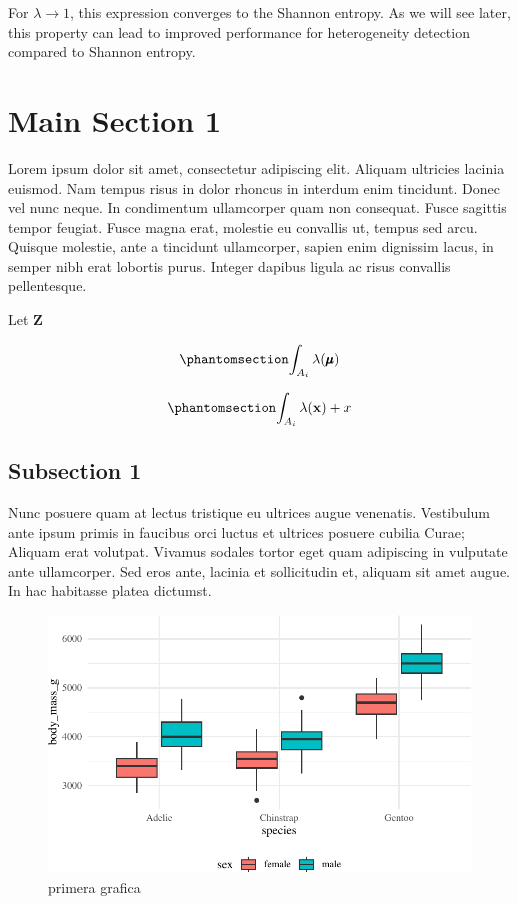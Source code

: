 \documentclass[
  letterpaper,
  11pt,
  english,
  doublespacing,
  headsepline,
  consistentlayout,
  oneside,
  openany]{MastersDoctoralThesis}
\begin{document}
For \(\lambda \to 1\), this expression converges to the Shannon entropy.
As we will see later, this property can lead to improved performance for
heterogeneity detection compared to Shannon entropy.

\section{Main Section 1}\label{main-section-1}

Lorem ipsum dolor sit amet, consectetur adipiscing elit. Aliquam
ultricies lacinia euismod. Nam tempus risus in dolor rhoncus in interdum
enim tincidunt. Donec vel nunc neque. In condimentum ullamcorper quam
non consequat. Fusce sagittis tempor feugiat. Fusce magna erat, molestie
eu convallis ut, tempus sed arcu. Quisque molestie, ante a tincidunt
ullamcorper, sapien enim dignissim lacus, in semper nibh erat lobortis
purus. Integer dapibus ligula ac risus convallis pellentesque.

Let \(\bm{Z}\)

\begin{equation}\phantomsection\label{eq-pmb}{
\int_{A_i}{\lambda (\pmb{\mu})}
}\end{equation}

\begin{equation}\phantomsection\label{eq-mathbf}{
\int_{A_i}{\lambda (\mathbf{x})} + x
}\end{equation}

\subsection{Subsection 1}\label{subsection-1}

Nunc posuere quam at lectus tristique eu ultrices augue venenatis.
Vestibulum ante ipsum primis in faucibus orci luctus et ultrices posuere
cubilia Curae; Aliquam erat volutpat. Vivamus sodales tortor eget quam
adipiscing in vulputate ante ullamcorper. Sed eros ante, lacinia et
sollicitudin et, aliquam sit amet augue. In hac habitasse platea
dictumst.

\begin{figure}[H]

\caption{primera grafica}

{\centering \includegraphics[width=12cm,height=\textheight]{Chapters/Chapter2_files/figure-pdf/unnamed-chunk-2-1.pdf}

}

\end{figure}%
\end{document}
